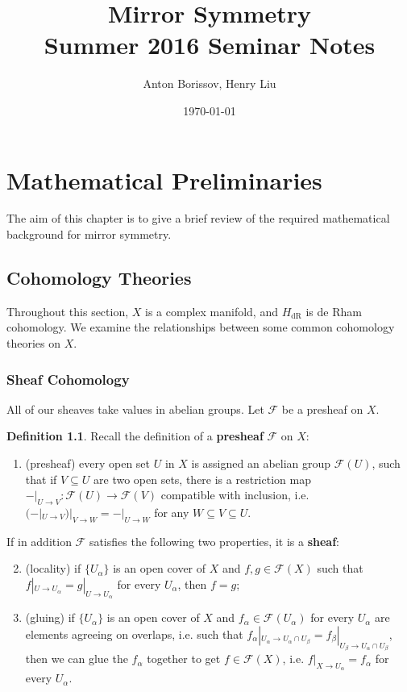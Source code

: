 \documentclass{report}
\title{Mirror Symmetry\\Summer 2016 Seminar Notes}
\author{Anton Borissov, Henry Liu}
\date{\today}
\theoremstyle{plain}
\theoremstyle{definition}
\newtheorem{definition}[theorem]{Definition}
\theoremstyle{remark}
\newcommand{\cF}{\mathcal{F}}
\newcommand{\dR}{\mathrm{dR}}
\begin{document}
\hypersetup{pageanchor=false}
\maketitle
\hypersetup{pageanchor=true}

\tableofcontents

\chapter{Mathematical Preliminaries}

The aim of this chapter is to give a brief review of the required
mathematical background for mirror symmetry.

\section{Cohomology Theories}

Throughout this section, $X$ is a complex manifold, and $H_{\dR}$ is
de Rham cohomology. We examine the relationships between some common
cohomology theories on $X$.

\subsection{Sheaf Cohomology}

All of our sheaves take values in abelian groups. Let $\cF$ be a
presheaf on $X$.

\begin{definition}
  Recall the definition of a {\bf presheaf} $\cF$ on $X$:
  \begin{enumerate}
  \item (presheaf) every open set $U$ in $X$ is assigned an abelian
    group $\cF(U)$, such that if $V \subseteq U$ are two open sets,
    there is a restriction map $-|_{U \to V}\colon \cF(U) \to \cF(V)$
    compatible with inclusion, i.e. $(-|_{U \to V})|_{V \to W} = -|_{U
      \to W}$ for any $W \subseteq V \subseteq U$.
  \end{enumerate}
  If in addition $\cF$ satisfies the following two properties, it is a
  {\bf sheaf}:
  \begin{enumerate}
  \setcounter{enumi}{1}
  \item (locality) if $\{U_\alpha\}$ is an open cover of $X$ and $f, g
    \in \cF(X)$ such that $f|_{U \to U_\alpha} = g|_{U \to U_\alpha}$
    for every $U_\alpha$, then $f = g$;
  \item (gluing) if $\{U_\alpha\}$ is an open cover of $X$ and
    $f_\alpha \in \cF(U_\alpha)$ for every $U_\alpha$ are elements
    agreeing on overlaps, i.e. such that $f_\alpha|_{U_\alpha \to
      U_\alpha \cap U_\beta} = f_\beta|_{U_\beta \to U_\alpha \cap
      U_\beta}$, then we can glue the $f_\alpha$ together to get $f
    \in \cF(X)$, i.e. $f|_{X \to U_\alpha} = f_\alpha$ for every
    $U_\alpha$.
  \end{enumerate}
\end{definition}
\end{document}
